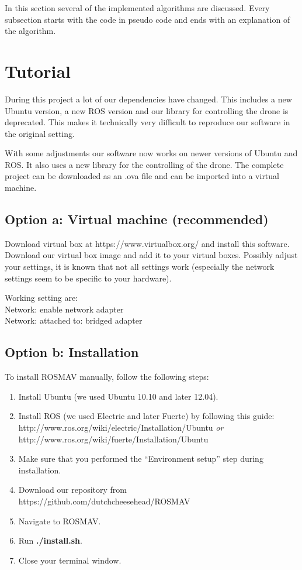 \documentclass[a4paper,10pt]{article}
\begin{document}
In this section several of the implemented algorithms are discussed. Every subsection starts with the code in pseudo code and ends with an explanation of the algorithm. 

\section{Tutorial}
During this project a lot of our dependencies have changed. This includes a new Ubuntu version, a new ROS version and our library for controlling the drone is deprecated. This makes it technically very difficult to reproduce our software in the original setting. 

With some adjustments our software now works on newer versions of Ubuntu and ROS. It also uses a new library for the controlling of the drone. The complete project can be downloaded as an .ova file and can be imported into a virtual machine. 
\subsection{Option a: Virtual machine (recommended)}
Download virtual box at https://www.virtualbox.org/ and install this software. 
Download our virtual box image and add it to your virtual boxes. 
Possibly adjust your settings, it is known that not all settings work (especially the network settings seem to be specific to your hardware). 

Working setting are: \\
Network: enable network adapter\\
Network: attached to: bridged adapter

\subsection{Option b: Installation}
To install ROSMAV manually, follow the following steps:
\begin{enumerate}
\item Install Ubuntu (we used Ubuntu 10.10 and later 12.04).

\item Install ROS (we used Electric and later Fuerte) by following this guide: \\
	  http://www.ros.org/wiki/electric/Installation/Ubuntu \textit{or}\\
	  http://www.ros.org/wiki/fuerte/Installation/Ubuntu

\item Make sure that you performed the ``Environment setup'' step during installation.

\item Download our repository from
      https://github.com/dutchcheesehead/ROSMAV

\item Navigate to ROSMAV.

\item Run \textbf{./install.sh}.
\item Close your terminal window.
\end{enumerate}
\end{document}
